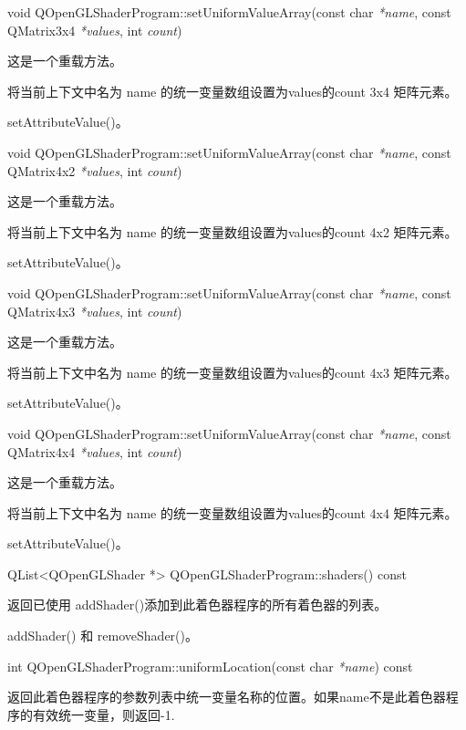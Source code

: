 void QOpenGLShaderProgram::setUniformValueArray(const char \emph{*name}, const QMatrix3x4 \emph{*values}, int \emph{count})

这是一个重载方法。

将当前上下文中名为 name 的统一变量数组设置为values的count 3x4 矩阵元素。

\begin{seeAlso}
setAttributeValue()。
\end{seeAlso}

void QOpenGLShaderProgram::setUniformValueArray(const char \emph{*name}, const QMatrix4x2 \emph{*values}, int \emph{count})

这是一个重载方法。

将当前上下文中名为 name 的统一变量数组设置为values的count 4x2 矩阵元素。

\begin{seeAlso}
setAttributeValue()。
\end{seeAlso}

void QOpenGLShaderProgram::setUniformValueArray(const char \emph{*name}, const QMatrix4x3 \emph{*values}, int \emph{count})

这是一个重载方法。

将当前上下文中名为 name 的统一变量数组设置为values的count 4x3 矩阵元素。

\begin{seeAlso}
setAttributeValue()。
\end{seeAlso}

void QOpenGLShaderProgram::setUniformValueArray(const char \emph{*name}, const QMatrix4x4 \emph{*values}, int \emph{count})

这是一个重载方法。

将当前上下文中名为 name 的统一变量数组设置为values的count 4x4 矩阵元素。

\begin{seeAlso}
setAttributeValue()。
\end{seeAlso}

QList<QOpenGLShader *> QOpenGLShaderProgram::shaders() const

返回已使用 addShader()添加到此着色器程序的所有着色器的列表。

\begin{seeAlso}
addShader() 和 removeShader()。
\end{seeAlso}

int QOpenGLShaderProgram::uniformLocation(const char \emph{*name}) const

返回此着色器程序的参数列表中统一变量名称的位置。如果name不是此着色器程序的有效统一变量，则返回-1.

